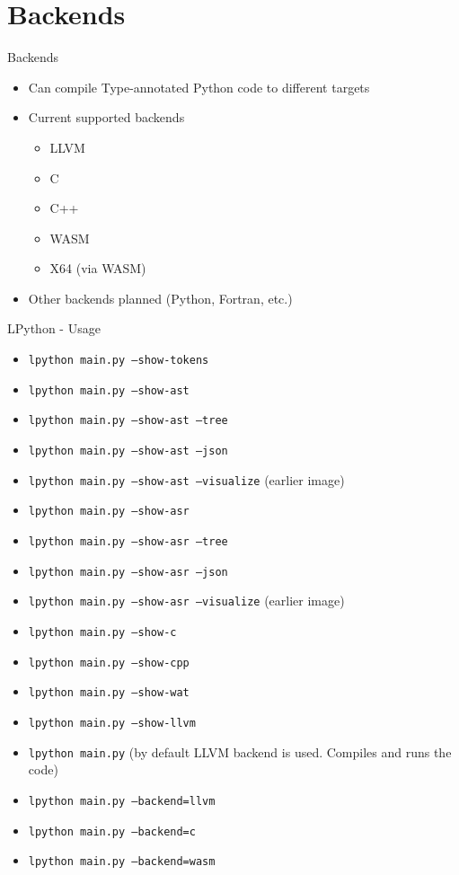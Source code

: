 \section{Backends}

\begin{frame}{Backends}
    \begin{itemize}
        \item Can compile Type-annotated Python code to different targets
        \item Current supported backends
            \begin{itemize}
                \item LLVM
                \item C
                \item C++
                \item WASM
                \item X64 (via WASM)
            \end{itemize}
        \item Other backends planned (Python, Fortran, etc.)
    \end{itemize}
\end{frame}

\begin{frame}{LPython - Usage}
    \scriptsize
    \begin{itemize}
        \item \texttt{lpython main.py --show-tokens}
        \item \texttt{lpython main.py --show-ast}
        \item \texttt{lpython main.py --show-ast --tree}
        \item \texttt{lpython main.py --show-ast --json}
        \item \texttt{lpython main.py --show-ast --visualize} (earlier image)
       \item \texttt{lpython main.py --show-asr}
        \item \texttt{lpython main.py --show-asr --tree}
        \item \texttt{lpython main.py --show-asr --json}
        \item \texttt{lpython main.py --show-asr --visualize} (earlier image)
        \item \texttt{lpython main.py --show-c}
        \item \texttt{lpython main.py --show-cpp}
        \item \texttt{lpython main.py --show-wat}
        \item \texttt{lpython main.py --show-llvm}
        \item \texttt{lpython main.py} (by default LLVM backend is used. Compiles and runs the code)
        \item \texttt{lpython main.py --backend=llvm}
        \item \texttt{lpython main.py --backend=c}
        \item \texttt{lpython main.py --backend=wasm}
    \end{itemize}
\end{frame}

